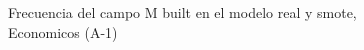 \begin{figure}[H]
    \centering
    
    \caption{Frecuencia del campo M built en el modelo real y smote, Economicos (A-1)}
    \label{frecuency-M Built-smote-enc}
\end{figure}